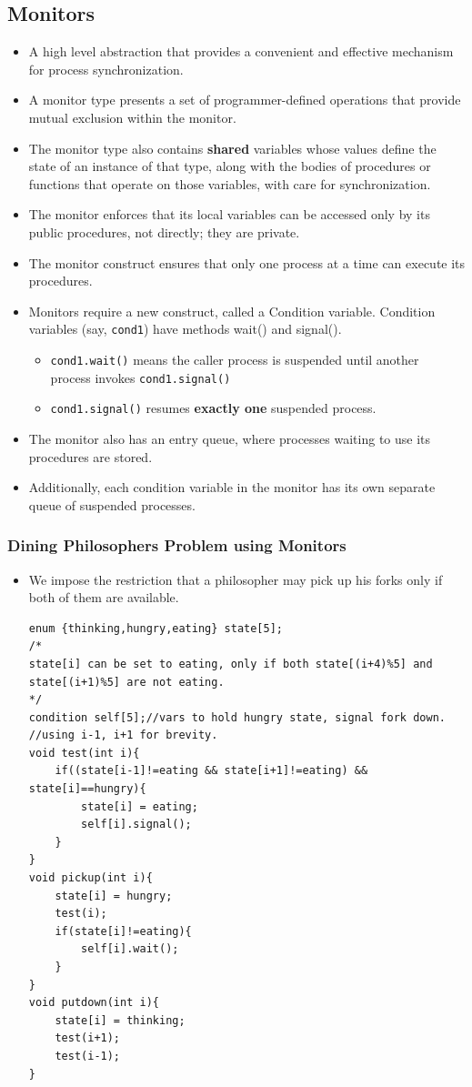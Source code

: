 \documentclass[10pt]{report}
\begin{document}
\subsection{Monitors}
\begin{itemize}
\item A high level abstraction that provides a convenient and effective mechanism for process synchronization.
\item A monitor type presents a set of programmer-defined operations that provide mutual exclusion within the monitor.
\item The monitor type also contains \textbf{shared} variables whose values define the state of an instance of that type, along with the bodies of procedures or functions that operate on those variables, with care for synchronization.
\item The monitor enforces that its local variables can be accessed only by its public procedures, not directly; they are private.
\item The monitor construct ensures that only one process at a time can execute its procedures.
\item Monitors require a new construct, called a Condition variable. Condition variables (say, \texttt{cond1}) have methods wait() and signal().
\begin{itemize}
\item \texttt{cond1.wait()} means the caller process is suspended until another\\process invokes \texttt{cond1.signal()}
\item \texttt{cond1.signal()} resumes \textbf{exactly one} suspended process.
\end{itemize}
\item The monitor also has an entry queue, where processes waiting to use its procedures are stored.
\item Additionally, each condition variable in the monitor has its own separate queue of suspended processes.
\end{itemize}
\subsubsection{Dining Philosophers Problem using Monitors}
\begin{itemize}
\item We impose the restriction that a philosopher may pick up his forks only if both of them are available.
\begin{lstlisting}
enum {thinking,hungry,eating} state[5];
/*
state[i] can be set to eating, only if both state[(i+4)%5] and state[(i+1)%5] are not eating.
*/
condition self[5];//vars to hold hungry state, signal fork down.
//using i-1, i+1 for brevity.
void test(int i){
    if((state[i-1]!=eating && state[i+1]!=eating) && state[i]==hungry){
        state[i] = eating;
        self[i].signal();
    }
}
void pickup(int i){
    state[i] = hungry;
    test(i);
    if(state[i]!=eating){
        self[i].wait();
    }
}
void putdown(int i){
    state[i] = thinking;
    test(i+1);
    test(i-1);
}
\end{lstlisting}
\end{itemize}
\end{document}
